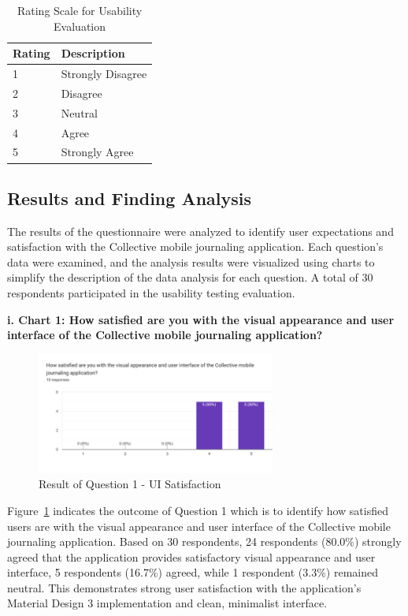 \begin{table}[H]
\centering
\caption{Rating Scale for Usability Evaluation}
\label{tab:rating-scale}
\begin{tabular}{|p{1.5cm}|p{12.5cm}|}
\hline
\textbf{Rating} & \textbf{Description} \\
\hline
1 & Strongly Disagree \\
\hline
2 & Disagree \\
\hline
3 & Neutral \\
\hline
4 & Agree \\
\hline
5 & Strongly Agree \\
\hline
\end{tabular}
\end{table}

\subsection{Results and Finding Analysis}\label{sec:resultsFindings}

The results of the questionnaire were analyzed to identify user expectations and satisfaction with the Collective mobile journaling application. Each question's data were examined, and the analysis results were visualized using charts to simplify the description of the data analysis for each question. A total of 30 respondents participated in the usability testing evaluation.

\textbf{i. Chart 1: How satisfied are you with the visual appearance and user interface of the Collective mobile journaling application?}

\begin{figure}[H]
\centering
\includegraphics[width=0.7\textwidth]{files/imgs/survey/chart1_ui_satisfaction.png}
\caption{Result of Question 1 - UI Satisfaction}
\label{fig:chart1-ui}
\end{figure}

Figure~\ref{fig:chart1-ui} indicates the outcome of Question 1 which is to identify how satisfied users are with the visual appearance and user interface of the Collective mobile journaling application. Based on 30 respondents, 24 respondents (80.0\%) strongly agreed that the application provides satisfactory visual appearance and user interface, 5 respondents (16.7\%) agreed, while 1 respondent (3.3\%) remained neutral. This demonstrates strong user satisfaction with the application's Material Design 3 implementation and clean, minimalist interface.


